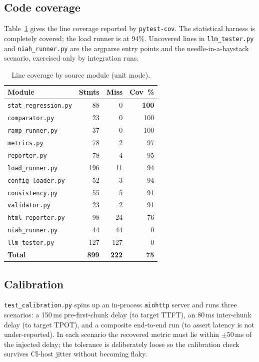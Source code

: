 \documentclass[sigconf,nonacm]{acmart}
\begin{document}
\subsection{Code coverage}
Table~\ref{tab:cov} gives the line coverage reported by
\texttt{pytest-cov}. The statistical harness is completely covered; the
load runner is at 94\%. Uncovered lines in \texttt{llm\_tester.py} and
\texttt{niah\_runner.py} are the argparse entry points and the
needle-in-a-haystack scenario, exercised only by integration runs.

\begin{table}[h]
\centering
\caption{Line coverage by source module (unit mode).}
\label{tab:cov}
\small
\begin{tabular}{@{}lrrr@{}}
\toprule
\textbf{Module} & \textbf{Stmts} & \textbf{Miss} & \textbf{Cov~\%} \\
\midrule
\texttt{stat\_regression.py}  & 88  & 0   & \textbf{100} \\
\texttt{comparator.py}        & 23  & 0   & 100 \\
\texttt{ramp\_runner.py}      & 37  & 0   & 100 \\
\texttt{metrics.py}           & 78  & 2   & 97 \\
\texttt{reporter.py}          & 78  & 4   & 95 \\
\texttt{load\_runner.py}      & 196 & 11  & 94 \\
\texttt{config\_loader.py}    & 52  & 3   & 94 \\
\texttt{consistency.py}       & 55  & 5   & 91 \\
\texttt{validator.py}         & 23  & 2   & 91 \\
\texttt{html\_reporter.py}    & 98  & 24  & 76 \\
\texttt{niah\_runner.py}      & 44  & 44  & 0  \\
\texttt{llm\_tester.py}       & 127 & 127 & 0  \\
\midrule
\textbf{Total}                & \textbf{899} & \textbf{222} & \textbf{75} \\
\bottomrule
\end{tabular}
\end{table}

\subsection{Calibration}
\texttt{test\_calibration.py} spins up an in-process \texttt{aiohttp}
server and runs three scenarios: a 150\,ms pre-first-chunk delay (to
target TTFT), an 80\,ms inter-chunk delay (to target TPOT), and a
composite end-to-end run (to assert latency is not under-reported).
In each scenario the recovered metric must lie within $\pm 50$\,ms of
the injected delay; the tolerance is deliberately loose so the
calibration check survives CI-host jitter without becoming flaky.
\end{document}

